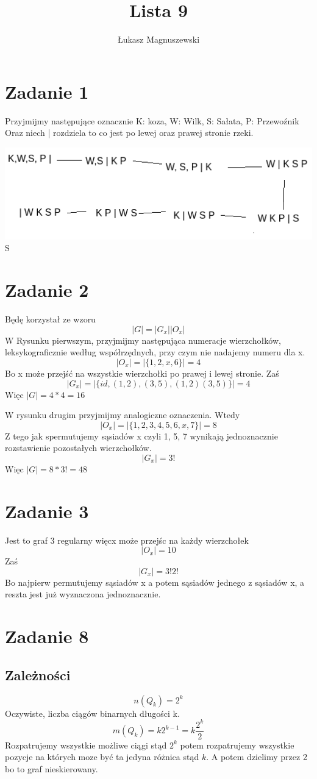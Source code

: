 \documentclass{article}
\title{Lista 9}
\author{Łukasz Magnuszewski}
\date{\vspace{-5ex}}
\begin{document}
\maketitle

\section*{Zadanie 1}
Przyjmijmy następujące oznacznie
K: koza,
W: Wilk,
S: Sałata,
P: Przewoźnik
Oraz niech | rozdziela to co jest po lewej oraz prawej stronie rzeki.

\includegraphics{koza}S
\section*{Zadanie 2}
Będę korzystał ze wzoru
\[
  |G| = |G_x| | O_x|
\]
W Rysunku pierwszym, przyjmijmy następująca numeracje wierzchołków, leksykograficznie według współrzędnych, przy czym nie nadajemy numeru dla x.
\[
  |O_x| = |\{1, 2, x, 6\}| = 4
\]
Bo x może przejść na wszystkie wierzchołki po prawej i lewej stronie.
Zaś 
\[
  |G_x| = |\{id, (1,2), (3,5), (1,2)(3,5)\}| = 4
\]
Więc $|G| = 4 * 4 = 16$


W rysunku drugim przyjmijmy analogiczne oznaczenia. Wtedy
\[
  |O_x| = |\{1, 2, 3, 4, 5, 6, x, 7\}| = 8
\]
Z tego jak spermutujemy sąsiadów x czyli 1, 5, 7 wynikają jednoznacznie rozstawienie pozostałych wierzchołków.
\[
  |G_x| = 3!
\]
Więc $|G| = 8 * 3! = 48$
\section*{Zadanie 3}
Jest to graf 3 regularny więcx może przejśc na każdy wierzchołek
\[
  |O_x| = 10
\]
Zaś 
\[
  |G_x| = 3! 2!
\]
Bo najpierw permutujemy sąsiadów x a potem sąsiadów jednego z sąsiadów x, a reszta jest już wyznaczona jednoznacznie.

\section*{Zadanie 8}
\subsection*{Zależności}
\[
n(Q_k) = 2^k  
\]
Oczywiste, liczba ciągów binarnych długości k.
\[
m(Q_k) = k 2^{k-1}  = k \frac{2^k}{2}
\]
Rozpatrujemy wszystkie możliwe ciągi stąd $2^k$ potem rozpatrujemy wszystkie pozycje na których moze być ta jedyna różnica stąd $k$. A potem dzielimy przez 2 bo to graf nieskierowany.
\end{document}
